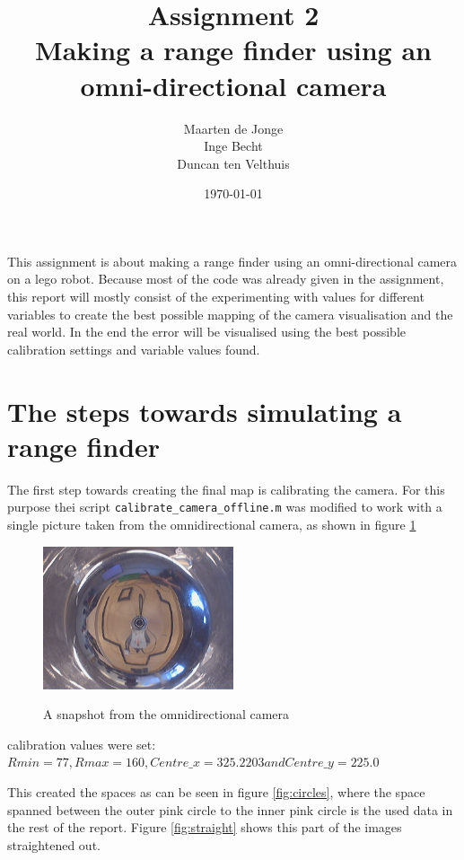 \documentclass[a4paper, 20pt]{report}
\author{Maarten de Jonge \\
    Inge Becht\\
Duncan ten Velthuis}
\date{\today}
\title{Assignment 2\\ 
Making a range finder using an omni-directional camera }
\begin{document}
\maketitle

This assignment is about making a range finder using an omni-directional
camera on a lego robot. 
Because most of the code was already given in the assignment, this report
will mostly consist of the experimenting with values for different variables to
create the best possible mapping of the camera visualisation and the real world.
In the end the error will be visualised using the best possible calibration
settings and variable values found.

\section{The steps towards simulating a range finder}

The first step towards creating the final map is calibrating the camera. For
this purpose thei script \texttt{calibrate\_camera\_offline.m} was modified to
work with a single picture taken from the omnidirectional camera, as shown in
figure \ref{fig:snapshot}


\begin{figure}[!ht]
\centering
  \includegraphics[width=0.5\textwidth]{omni_snapshot.jpg}
  \label{fig:snapshot}
  \caption{A snapshot from the omnidirectional camera}
\end{figure}

calibration values were set: $Rmin = 77,Rmax = 160, Centre\_x = 325.2203 and
Centre\_y =  225.0$

This created the spaces as can be seen in figure \ref{fig:circles}, where the space spanned between the
outer pink circle to
the inner pink circle is the used data in the rest of the report. Figure
\ref{fig:straight} shows this part of the images straightened out.
\end{document}
